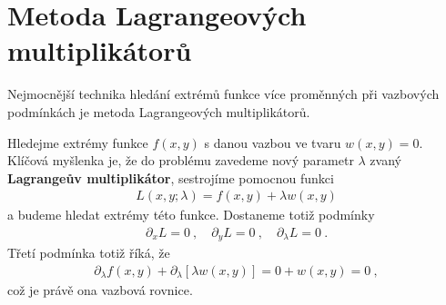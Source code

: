 \section{Metoda Lagrangeových multiplikátorů}

Nejmocnější technika hledání extrémů funkce více proměnných při vazbových podmínkách je metoda Lagrangeových multiplikátorů.

Hledejme extrémy funkce $f(x,y)$ s danou vazbou ve tvaru $w(x,y)=0$. Klíčová myšlenka je, že do problému zavedeme nový parametr $\lambda$ zvaný \textbf{Lagrangeův multiplikátor}, sestrojíme pomocnou funkci \begin{align}
    \boxed{L(x,y;\lambda) = f(x,y) + \lambda w(x,y) }
\end{align}
a budeme hledat extrémy této funkce. Dostaneme totiž podmínky \begin{align}
    \boxed{ \partial_x L = 0 \:, \quad \partial_y L = 0 \:, \quad \partial_\lambda L = 0 }\:.
\end{align}
Třetí podmínka totiž říká, že \begin{align}
    \partial_\lambda f(x,y) + \partial_\lambda [\lambda w(x,y)] = 0 + w(x,y) = 0 \:,
\end{align}
což je právě ona vazbová rovnice.

